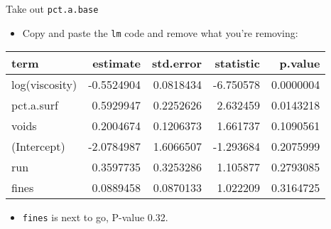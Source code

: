 \begin{frame}[fragile]{Take out \texttt{pct.a.base}}
\protect\hypertarget{take-out-pct.a.base}{}
\begin{itemize}
\tightlist
\item
  Copy and paste the \texttt{lm} code and remove what you're removing:
\end{itemize}

\small

\begin{Shaded}
\begin{Highlighting}[]
\NormalTok{ \textless{}{-}}\StringTok{ }\NormalTok{(}\OperatorTok{\textasciitilde{}}\StringTok{ }\OperatorTok{+}\StringTok{ }\OperatorTok{+}\StringTok{ }\OperatorTok{+}\StringTok{ }
\StringTok{              }\OperatorTok{+}\StringTok{ }
\NormalTok{) }\OperatorTok{\%\textgreater{}\%}\StringTok{ }
\end{Highlighting}
\end{Shaded}

\begin{longtable}[]{@{}lrrrr@{}}
\toprule
term & estimate & std.error & statistic & p.value\tabularnewline
\midrule
\endhead
log(viscosity) & -0.5524904 & 0.0818434 & -6.750578 &
0.0000004\tabularnewline
pct.a.surf & 0.5929947 & 0.2252626 & 2.632459 & 0.0143218\tabularnewline
voids & 0.2004674 & 0.1206373 & 1.661737 & 0.1090561\tabularnewline
(Intercept) & -2.0784987 & 1.6066507 & -1.293684 &
0.2075999\tabularnewline
run & 0.3597735 & 0.3253286 & 1.105877 & 0.2793085\tabularnewline
fines & 0.0889458 & 0.0870133 & 1.022209 & 0.3164725\tabularnewline
\bottomrule
\end{longtable}

\normalsize

\begin{itemize}
\tightlist
\item
  \texttt{fines} is next to go, P-value 0.32.
\end{itemize}
\end{frame}

